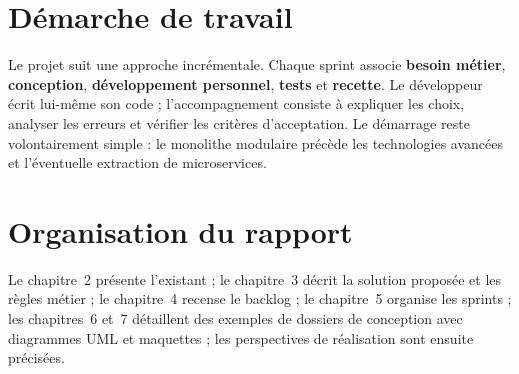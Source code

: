 \section{Démarche de travail}
Le projet suit une approche incrémentale. Chaque sprint associe \textbf{besoin métier}, \textbf{conception}, \textbf{développement personnel}, \textbf{tests} et \textbf{recette}. Le développeur écrit lui-même son code ; l’accompagnement consiste à expliquer les choix, analyser les erreurs et vérifier les critères d’acceptation. Le démarrage reste volontairement simple : le monolithe modulaire précède les technologies avancées et l’éventuelle extraction de microservices.

\section{Organisation du rapport}
Le chapitre~2 présente l’existant ; le chapitre~3 décrit la solution proposée et les règles métier ; le chapitre~4 recense le backlog ; le chapitre~5 organise les sprints ; les chapitres~6 et~7 détaillent des exemples de dossiers de conception avec diagrammes UML et maquettes ; les perspectives de réalisation sont ensuite précisées.
